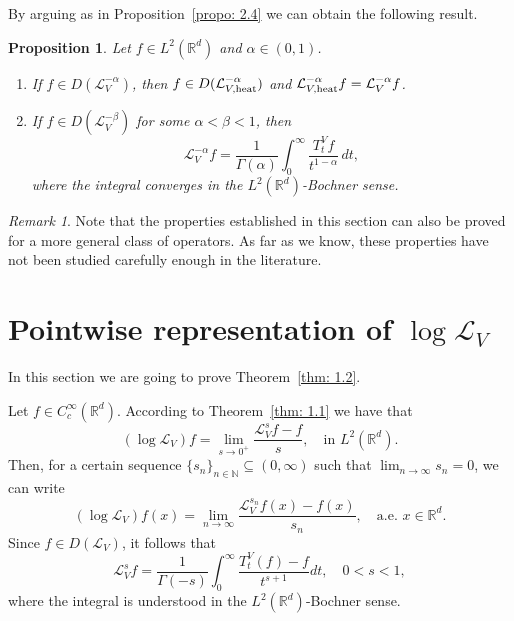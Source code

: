 \documentclass[10pt, a4paper, reqno]{amsart}
\newtheorem{prop}[thm]{Proposition}
\theoremstyle{definition}
\theoremstyle{remark}
\newtheorem{rem}[thm]{Remark}
\newcommand{\RR}{\mathbb{R}}
\newcommand{\NN}{\mathbb{N}}
\numberwithin{equation}{section}
\begin{document}
By arguing as in Proposition~\ref{propo: 2.4} we can obtain the following result. 

\begin{prop}\label{propo: 2.5}
      Let $f \in L^2(\mathbb{R}^d)$ and $\alpha \in (0,1)$.
    \begin{enumerate}
        \item\label{item: propo 2.5 - a} If $f \in D(\mathcal{L}_V^{-\alpha})$, then $f \in D(\mathcal{L}_{V,\textup{heat}}^{-\alpha})$ and $\mathcal{L}_{V,\textup{heat}}^{-\alpha} f = \mathcal{L}_V^{-\alpha} f$.
        \item\label{item: propo 2.5 - b} If $f \in D(\mathcal{L}_V^{-\beta})$ for some $\alpha < \beta < 1$, then
        \[
        \mathcal{L}_V^{-\alpha} f = \frac{1}{\Gamma(\alpha)} \int_0^\infty \frac{T_t^V f}{t^{1-\alpha}} \, dt,
        \]
        where the integral converges in the $L^2(\mathbb{R}^d)$-Bochner sense.
    \end{enumerate}
\end{prop}

\begin{rem}
    Note that the properties established in this section can also be proved for a more general class of operators. As far as we know, these properties have not been studied carefully enough in the literature.
\end{rem}

\section{Pointwise representation of \texorpdfstring{$\log \mathcal{L}_V$}{log LV}}\label{sec: 3}

In this section we are going to prove Theorem~\ref{thm: 1.2}. 

Let $f\in C_c^\infty (\RR^d)$. According to Theorem~\ref{thm: 1.1} we have that
\[(\log \mathcal{L}_V)f=\lim_{s\to 0^+}\frac{\mathcal{L}_V^s f-f}{s}, \quad \text{in }L^2(\RR^d).\]
Then, for a certain sequence $\{s_n\}_{n\in \NN}\subseteq (0,\infty)$ such that $\lim_{n\to \infty}s_n=0$, we can write
\begin{equation}\label{eq: log LVsf ctp}
    (\log \mathcal{L}_V)f(x)=\lim_{n\to\infty}\frac{\mathcal{L}_V^{s_n} f(x)-f(x)}{s_n}, \quad \text{a.e. }x\in \RR^d.
\end{equation}
Since $f\in D(\mathcal{L}_V)$, it follows that 
\[\mathcal{L}_V^s f=\frac{1}{\Gamma(-s)}\int_0^\infty \frac{T_t^V(f)-f}{t^{s+1}}dt, \quad 0<s<1,\]
where the integral is understood in the $L^2(\RR^d)$-Bochner sense.
\end{document}
